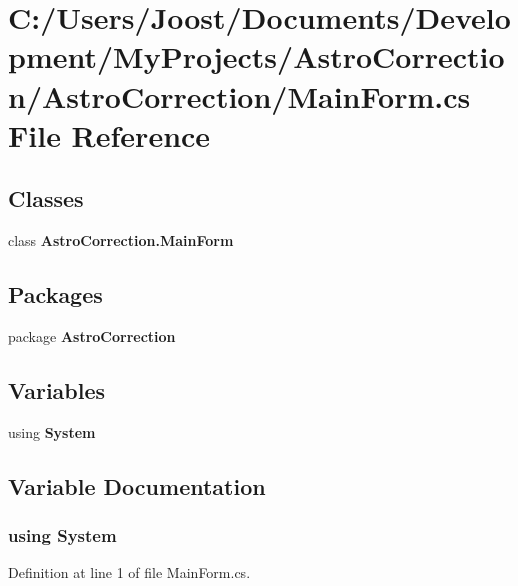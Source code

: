 \section{C:/Users/Joost/Documents/Development/MyProjects/AstroCorrection/AstroCorrection/MainForm.cs File Reference}
\label{_main_form_8cs}
\subsection*{Classes}
\begin{DoxyCompactItemize}
\item 
class {\bf AstroCorrection.MainForm}
\end{DoxyCompactItemize}
\subsection*{Packages}
\begin{DoxyCompactItemize}
\item 
package {\bf AstroCorrection}
\end{DoxyCompactItemize}
\subsection*{Variables}
\begin{DoxyCompactItemize}
\item 
﻿using {\bf System}
\end{DoxyCompactItemize}


\subsection{Variable Documentation}
\subsubsection[{System}]{\setlength{\rightskip}{0pt plus 5cm}﻿using {\bf System}}\label{_main_form_8cs_a81a223a02c34d82b47199f08308847f2}


Definition at line 1 of file MainForm.cs.